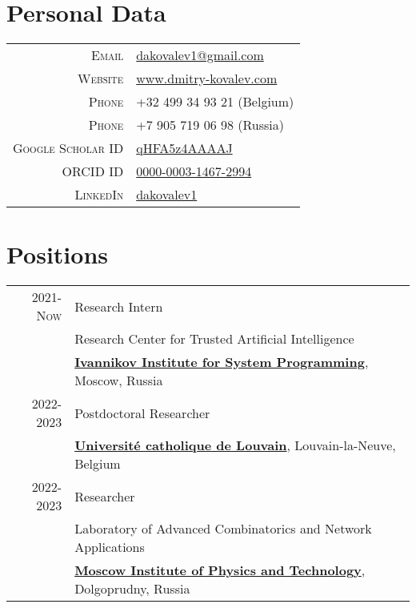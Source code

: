 \section{Personal Data}

\begin{tabular}{rl}
	\textsc{Email} & \href{mailto:dakovalev1@gmail.com}{dakovalev1@gmail.com}\\
	\textsc{Website} & \href{https://www.dmitry-kovalev.com}{www.dmitry-kovalev.com}\\
	\textsc{Phone} &  +32 499 34 93 21 (Belgium)\\
	\textsc{Phone} & +7 905 719 06 98 (Russia)\\
	\textsc{Google Scholar ID} &\href{https://scholar.google.com/citations?user=qHFA5z4AAAAJ}{qHFA5z4AAAAJ}\\
	\textsc{ORCID ID} & \href{https://orcid.org/0000-0003-1467-2994}{0000-0003-1467-2994}\\
	\textsc{LinkedIn} & \href{https://www.linkedin.com/in/dakovalev1/}{dakovalev1}

\end{tabular}



\section{Positions}
\begin{tabular}{rl}	
	\textsc{2021-Now}& Research Intern\\
	&Research Center for Trusted Artificial Intelligence\\
	&\textbf{\href{https://www.ispras.ru/en/}{\color{black}Ivannikov Institute for System Programming}}, Moscow, Russia\\
	\textsc{2022-2023}& Postdoctoral Researcher\\
	& \textbf{\href{https://uclouvain.be/en/index.html}{\color{black}Université catholique de Louvain}}, Louvain-la-Neuve, Belgium\\
	\textsc{2022-2023}& Researcher\\
	&Laboratory of Advanced Combinatorics and Network Applications\\
	&\textbf{\href{https://mipt.ru/}{\color{black}Moscow Institute of Physics and Technology}}, Dolgoprudny, Russia
\end{tabular}


